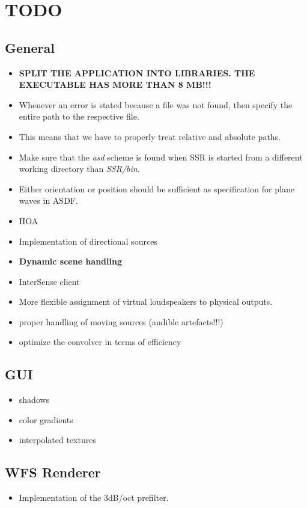 \section{TODO}
%
%
\subsection{General}
%
%
%
\begin{itemize}
\item {\bf SPLIT THE APPLICATION INTO LIBRARIES. THE EXECUTABLE HAS MORE THAN 8 MB!!!}
\item Whenever an error is stated because a file was not found, 
then specify the entire path to the respective file.
\item This means that we have to properly treat relative and absolute paths.
\item Make sure that the \emph{asd}  scheme is found when SSR is started 
from a different working directory than \emph{SSR/bin}.
\item Either orientation or position should be sufficient as specification 
for plane waves in ASDF.
\item HOA
\item Implementation of directional sources
\item {\bf Dynamic scene handling}
\item InterSense client
\item More flexible assignment of virtual loudspeakers to physical outputs.
\item proper handling of moving sources (audible artefacts!!!)
\item optimize the convolver in terms of efficiency
\end{itemize}
%
%
\subsection{GUI}
%
\begin{itemize}
\item shadows
\item color gradients
\item interpolated textures
\end{itemize}
%
%
\subsection{WFS Renderer}
%
\begin{itemize}
\item Implementation of the 3dB/oct prefilter.
\end{itemize}
%
%
%
